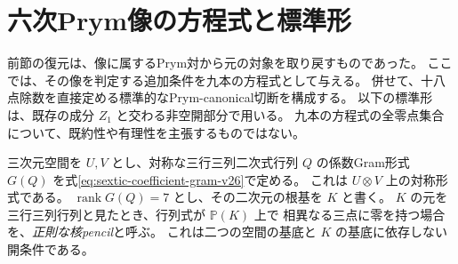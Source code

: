 \section{六次Prym像の方程式と標準形}
\label{sec:intrinsic-sextic-image-v28}

前節の復元は、像に属するPrym対から元の対象を取り戻すものであった。
ここでは、その像を判定する追加条件を九本の方程式として与える。
併せて、十八点除数を直接定める標準的なPrym-canonical切断を構成する。
以下の標準形は、既存の成分 $Z_1$ と交わる非空開部分で用いる。
九本の方程式の全零点集合について、既約性や有理性を主張するものではない。

三次元空間を $U,V$ とし、対称な三行三列二次式行列 $Q$ の係数Gram形式
$G(Q)$ を式\eqref{eq:sextic-coefficient-gram-v26}で定める。
これは $U\otimes V$ 上の対称形式である。
$\operatorname{rank}G(Q)=7$ とし、その二次元の根基を $K$ と書く。
$K$ の元を三行三列行列と見たとき、行列式が $\mathbb P(K)$ 上で
相異なる三点に零を持つ場合を、\emph{正則な核pencil}と呼ぶ。
これは二つの空間の基底と $K$ の基底に依存しない開条件である。

